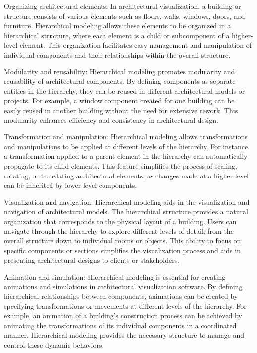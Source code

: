\documentclass{article}
\begin{document}
\begin{itemize}
Organizing architectural elements: In architectural visualization, a building or structure consists of various elements such as floors, walls, windows, doors, and furniture. Hierarchical modeling allows these elements to be organized in a hierarchical structure, where each element is a child or subcomponent of a higher-level element. This organization facilitates easy management and manipulation of individual components and their relationships within the overall structure.

Modularity and reusability: Hierarchical modeling promotes modularity and reusability of architectural components. By defining components as separate entities in the hierarchy, they can be reused in different architectural models or projects. For example, a window component created for one building can be easily reused in another building without the need for extensive rework. This modularity enhances efficiency and consistency in architectural design.

Transformation and manipulation: Hierarchical modeling allows transformations and manipulations to be applied at different levels of the hierarchy. For instance, a transformation applied to a parent element in the hierarchy can automatically propagate to its child elements. This feature simplifies the process of scaling, rotating, or translating architectural elements, as changes made at a higher level can be inherited by lower-level components.

Visualization and navigation: Hierarchical modeling aids in the visualization and navigation of architectural models. The hierarchical structure provides a natural organization that corresponds to the physical layout of a building. Users can navigate through the hierarchy to explore different levels of detail, from the overall structure down to individual rooms or objects. This ability to focus on specific components or sections simplifies the visualization process and aids in presenting architectural designs to clients or stakeholders.

Animation and simulation: Hierarchical modeling is essential for creating animations and simulations in architectural visualization software. By defining hierarchical relationships between components, animations can be created by specifying transformations or movements at different levels of the hierarchy. For example, an animation of a building's construction process can be achieved by animating the transformations of its individual components in a coordinated manner. Hierarchical modeling provides the necessary structure to manage and control these dynamic behaviors.

\end{itemize}
\end{document}
